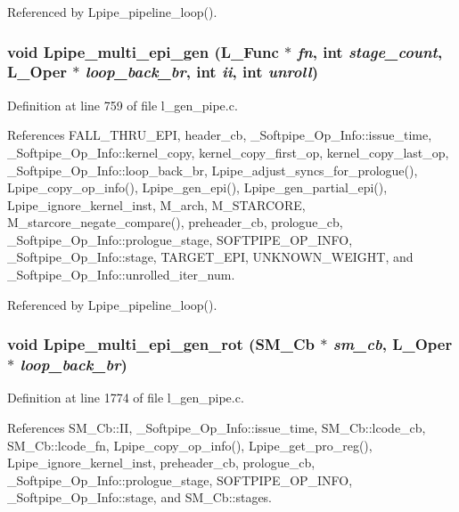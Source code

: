 Referenced by Lpipe\_\-pipeline\_\-loop().
\subsubsection{\setlength{\rightskip}{0pt plus 5cm}void Lpipe\_\-multi\_\-epi\_\-gen (L\_\-Func $\ast$ {\em fn}, int {\em stage\_\-count}, L\_\-Oper $\ast$ {\em loop\_\-back\_\-br}, int {\em ii}, int {\em unroll})}\label{l__gen__pipe_8c_aab08a046531a4539e4a0dbb0f861007}




Definition at line 759 of file l\_\-gen\_\-pipe.c.

References FALL\_\-THRU\_\-EPI, header\_\-cb, \_\-Softpipe\_\-Op\_\-Info::issue\_\-time, \_\-Softpipe\_\-Op\_\-Info::kernel\_\-copy, kernel\_\-copy\_\-first\_\-op, kernel\_\-copy\_\-last\_\-op, \_\-Softpipe\_\-Op\_\-Info::loop\_\-back\_\-br, Lpipe\_\-adjust\_\-syncs\_\-for\_\-prologue(), Lpipe\_\-copy\_\-op\_\-info(), Lpipe\_\-gen\_\-epi(), Lpipe\_\-gen\_\-partial\_\-epi(), Lpipe\_\-ignore\_\-kernel\_\-inst, M\_\-arch, M\_\-STARCORE, M\_\-starcore\_\-negate\_\-compare(), preheader\_\-cb, prologue\_\-cb, \_\-Softpipe\_\-Op\_\-Info::prologue\_\-stage, SOFTPIPE\_\-OP\_\-INFO, \_\-Softpipe\_\-Op\_\-Info::stage, TARGET\_\-EPI, UNKNOWN\_\-WEIGHT, and \_\-Softpipe\_\-Op\_\-Info::unrolled\_\-iter\_\-num.

Referenced by Lpipe\_\-pipeline\_\-loop().
\subsubsection{\setlength{\rightskip}{0pt plus 5cm}void Lpipe\_\-multi\_\-epi\_\-gen\_\-rot (\bf{SM\_\-Cb} $\ast$ {\em sm\_\-cb}, L\_\-Oper $\ast$ {\em loop\_\-back\_\-br})}\label{l__gen__pipe_8c_730dc4cccecf03f47801ce2b86ebb338}




Definition at line 1774 of file l\_\-gen\_\-pipe.c.

References SM\_\-Cb::II, \_\-Softpipe\_\-Op\_\-Info::issue\_\-time, SM\_\-Cb::lcode\_\-cb, SM\_\-Cb::lcode\_\-fn, Lpipe\_\-copy\_\-op\_\-info(), Lpipe\_\-get\_\-pro\_\-reg(), Lpipe\_\-ignore\_\-kernel\_\-inst, preheader\_\-cb, prologue\_\-cb, \_\-Softpipe\_\-Op\_\-Info::prologue\_\-stage, SOFTPIPE\_\-OP\_\-INFO, \_\-Softpipe\_\-Op\_\-Info::stage, and SM\_\-Cb::stages.

